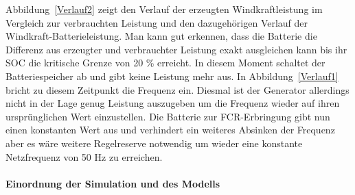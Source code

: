 Abbildung~\ref{Verlauf2} zeigt den Verlauf der erzeugten Windkraftleistung im Vergleich zur verbrauchten Leistung
und den dazugehörigen Verlauf der Windkraft-Batterieleistung.
Man kann gut erkennen, dass die Batterie die Differenz aus erzeugter und verbrauchter Leistung exakt ausgleichen kann
bis ihr SOC die kritische Grenze von 20 \% erreicht.
In diesem Moment schaltet der Batteriespeicher ab und gibt keine Leistung mehr aus.
In Abbildung~\ref{Verlauf1} bricht zu diesem Zeitpunkt die Frequenz ein.
Diesmal ist der Generator allerdings nicht in der Lage genug Leistung auszugeben um die Frequenz wieder auf ihren
ursprünglichen Wert einzustellen.
Die Batterie zur FCR-Erbringung gibt nun einen konstanten Wert aus und verhindert ein weiteres Absinken der Frequenz aber
es wäre weitere Regelreserve notwendig um wieder eine konstante Netzfrequenz von 50 Hz zu erreichen.
 
\paragraph{Einordnung der Simulation und des Modells}